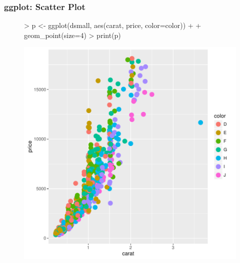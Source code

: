 \documentclass{beamer}
\begin{document}
\begin{frame}[containsverbatim]  
	\frametitle{ggplot: Scatter Plot}
\scriptsize 
\begin{figure}
  \centering
\begin{Schunk}
\begin{Sinput}
> p <- ggplot(dsmall, aes(carat, price, color=color)) + 
+             geom_point(size=4)
> print(p) 
\end{Sinput}
\end{Schunk}
\includegraphics{fig--044}
\label{fig:qplotscatter}
\end{figure}
\end{frame}
\end{document}
